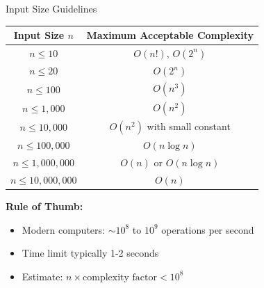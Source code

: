 \documentclass[aspectratio=169,xcolor=dvipsnames]{beamer}
\begin{document}
\begin{frame}{Input Size Guidelines}
  \begin{table}
    \centering
    \begin{tabular}{cc}
      \hline
      \textbf{Input Size $n$} & \textbf{Maximum Acceptable Complexity} \\
      \hline
      $n \le 10$ & $O(n!)$, $O(2^n)$ \\
      $n \le 20$ & $O(2^n)$ \\
      $n \le 100$ & $O(n^3)$ \\
      $n \le 1,000$ & $O(n^2)$ \\
      $n \le 10,000$ & $O(n^2)$ with small constant \\
      $n \le 100,000$ & $O(n \log n)$ \\
      $n \le 1,000,000$ & $O(n)$ or $O(n \log n)$ \\
      $n \le 10,000,000$ & $O(n)$ \\
      \hline
    \end{tabular}
  \end{table}

  \vspace{0.3cm}
  \textbf{Rule of Thumb:}
  \begin{itemize}
    \item Modern computers: $\sim 10^8$ to $10^9$ operations per second
    \item Time limit typically 1-2 seconds
    \item Estimate: $n \times \text{complexity factor} < 10^8$
  \end{itemize}
\end{frame}
\end{document}

